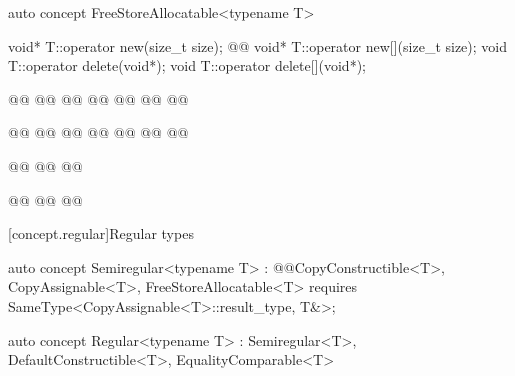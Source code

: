 \documentclass[american,twoside]{book}
\begin{document}
\begin{itemdecl}
auto concept FreeStoreAllocatable<typename T> {
  void* T::operator new(size_t size);
  @@
  void* T::operator new[](size_t size);
  void T::operator delete(void*);
  void T::operator delete[](void*);

  @@
    @@
      @@
    @@
      @@
    @\addedCC{\}}@
  @\addedCC{\}}@

  @@
    @@
      @@
    @@
      @@
    @\addedCC{\}}@
  @\addedCC{\}}@

  @@
    @@
  @\addedCC{\}}@

  @@
    @@
  @\addedCC{\}}@
}
\end{itemdecl}

\begin{itemdescr}
\pnum
{}
\end{itemdescr}

[concept.regular]{Regular types}

\begin{itemdecl}
auto concept Semiregular<typename T> 
  : @@CopyConstructible<T>, CopyAssignable<T>, FreeStoreAllocatable<T> { 
  requires SameType<CopyAssignable<T>::result_type, T&>;
}
\end{itemdecl}

\begin{itemdescr}
\pnum 
{}
\end{itemdescr}

\begin{itemdecl}
auto concept Regular<typename T> 
  : Semiregular<T>, DefaultConstructible<T>, EqualityComparable<T> { }
\end{itemdecl}
\end{document}
